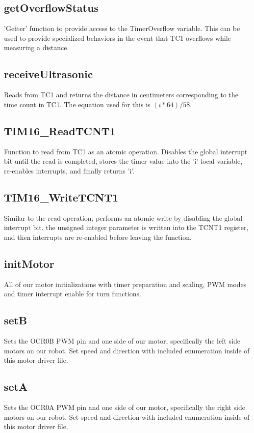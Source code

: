 \documentclass[letterpaper,11pt]{texMemo} %
\begin{document}
\subsection*{getOverflowStatus}
'Getter' function to provide access to the TimerOverflow variable. This can be used to provide specialized behaviors in the event that TC1 overflows while measuring a distance.

\subsection*{receiveUltrasonic}
Reads from TC1 and returns the distance in centimeters corresponding to the time count in TC1. The equation used for this is $(i * 64) / 58$.

\subsection*{TIM16\_ReadTCNT1}
Function to read from TC1 as an atomic operation. Disables the global interrupt bit until the read is completed, stores the timer value into the 'i' local variable, re-enables interrupts, and finally returns 'i'.

\subsection*{TIM16\_WriteTCNT1}
Similar to the read operation, performs an atomic write by disabling the global interrupt bit. the unsigned integer parameter is written into the TCNT1 register, and then interrupts are re-enabled before leaving the function.

\subsection*{initMotor}
All of our motor initializations with timer preparation and 
scaling, PWM modes and timer interrupt enable for turn functions.

\subsection*{setB}
Sets the OCR0B PWM pin and one side of our motor, specifically the 
left side motors on our robot. Set speed and direction with included 
enumeration inside of this motor driver file.

\subsection*{setA}
Sets the OCR0A PWM pin and one side of our motor, specifically the 
right side motors on our robot. Set speed and direction with included 
enumeration inside of this motor driver file.
\end{document}
